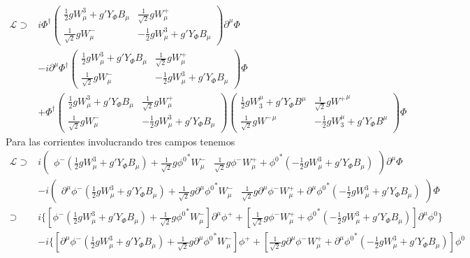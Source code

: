 \begin{align}
  \label{eq:186}
  \mathcal{L}\supset&i\Phi^\dagger  \begin{pmatrix}
      \frac{1}{2}gW^3_\mu+g'Y_\Phi B_\mu&\frac{1}{\sqrt{2}}gW^+_\mu\\
      \frac{1}{\sqrt{2}}gW^-_\mu&-\frac{1}{2}gW^3_\mu+g'Y_\Phi B_\mu
    \end{pmatrix}\partial^\mu\Phi\nonumber\\
    &-i\partial^\mu\Phi^\dagger\begin{pmatrix}
      \frac{1}{2}gW^3_\mu+g'Y_\Phi B_\mu&\frac{1}{\sqrt{2}}gW^+_\mu\\
      \frac{1}{\sqrt{2}}gW^-_\mu&-\frac{1}{2}gW^3_\mu+g'Y_\Phi B_\mu
    \end{pmatrix}\Phi\nonumber\\
&    +\Phi^\dagger\begin{pmatrix}
      \frac{1}{2}gW^3_\mu+g'Y_\Phi B_\mu&\frac{1}{\sqrt{2}}gW^+_\mu\\
      \frac{1}{\sqrt{2}}gW^-_\mu&-\frac{1}{2}gW^3_\mu+g'Y_\Phi B_\mu
    \end{pmatrix}
\begin{pmatrix}
      \frac{1}{2}gW_3^\mu+g'Y_\Phi B^\mu&\frac{1}{\sqrt{2}}g{W^+}^\mu\\
      \frac{1}{\sqrt{2}}g{W^-}^\mu&-\frac{1}{2}gW_3^\mu+g'Y_\Phi B^\mu
    \end{pmatrix}\Phi
\end{align}
Para las corrientes  involucrando tres campos tenemos
\begin{align}
  \mathcal{L}\supset&i  \begin{pmatrix}
      \phi^-(\frac{1}{2}gW^3_\mu+g'Y_\Phi B_\mu)+\frac{1}{\sqrt{2}}g{\phi^0}^*W^-_\mu&
      \frac{1}{\sqrt{2}}g\phi^-W^+_\mu+{\phi^0}^*(-\frac{1}{2}gW^3_\mu+g'Y_\Phi B_\mu)
    \end{pmatrix}\partial^\mu\Phi\nonumber\\
    &-i  \begin{pmatrix}
      \partial^\mu\phi^-(\frac{1}{2}gW^3_\mu+g'Y_\Phi B_\mu)+\frac{1}{\sqrt{2}}g{\partial^\mu\phi^0}^*W^-_\mu&
      \frac{1}{\sqrt{2}}g\partial^\mu\phi^-W^+_\mu+\partial^\mu{\phi^0}^*(-\frac{1}{2}gW^3_\mu+g'Y_\Phi B_\mu)
    \end{pmatrix}\Phi\nonumber\\
  \supset&i\{[\phi^-(\tfrac{1}{2}gW^3_\mu+g'Y_\Phi B_\mu)+\tfrac{1}{\sqrt{2}}g{\phi^0}^*W^-_\mu]\partial^\mu\phi^+
      +[\tfrac{1}{\sqrt{2}}g\phi^-W^+_\mu+{\phi^0}^*(-\tfrac{1}{2}gW^3_\mu+g'Y_\Phi B_\mu)]\partial^\mu\phi^0\}
      \nonumber\\
    &-i\{[\partial^\mu\phi^-(\tfrac{1}{2}gW^3_\mu+g'Y_\Phi B_\mu)+\tfrac{1}{\sqrt{2}}g{\partial^\mu\phi^0}^*W^-_\mu]\phi^+
      +[\tfrac{1}{\sqrt{2}}g\partial^\mu\phi^-W^+_\mu+\partial^\mu{\phi^0}^*(-\frac{1}{2}gW^3_\mu+g'Y_\Phi B_\mu)]\phi^0
\end{align}
